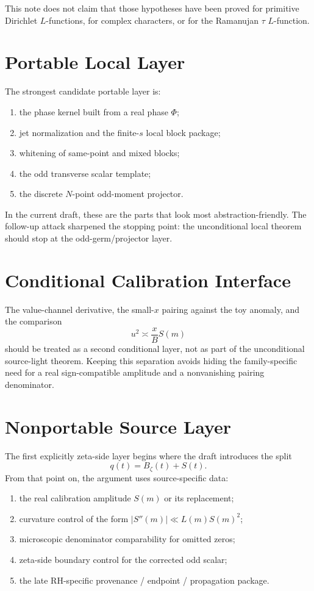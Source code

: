 \documentclass[11pt]{article}
\begin{document}
This note does not claim that those hypotheses have been proved for primitive
Dirichlet \(L\)-functions, for complex characters, or for the Ramanujan
\(\tau\) \(L\)-function.

\section{Portable Local Layer}

The strongest candidate portable layer is:

\begin{enumerate}
\item the phase kernel built from a real phase \(\Phi\);
\item jet normalization and the finite-\(s\) local block package;
\item whitening of same-point and mixed blocks;
\item the odd transverse scalar template;
\item the discrete \(N\)-point odd-moment projector.
\end{enumerate}

In the current draft, these are the parts that look most abstraction-friendly.
The follow-up attack sharpened the stopping point: the unconditional local
theorem should stop at the odd-germ/projector layer.

\section{Conditional Calibration Interface}

The value-channel derivative, the small-\(x\) pairing against the toy anomaly,
and the comparison
\[
u^2\asymp \frac{x}{B}S(m)
\]
should be treated as a second conditional layer, not as part of the
unconditional source-light theorem. Keeping this separation avoids hiding the
family-specific need for a real sign-compatible amplitude and a nonvanishing
pairing denominator.

\section{Nonportable Source Layer}

The first explicitly zeta-side layer begins where the draft introduces the
split
\[
q(t)=B_\zeta(t)+S(t).
\]
From that point on, the argument uses source-specific data:

\begin{enumerate}
\item the real calibration amplitude \(S(m)\) or its replacement;
\item curvature control of the form \(|S''(m)|\ll L(m)S(m)^2\);
\item microscopic denominator comparability for omitted zeros;
\item zeta-side boundary control for the corrected odd scalar;
\item the late RH-specific provenance / endpoint / propagation package.
\end{enumerate}
\end{document}
